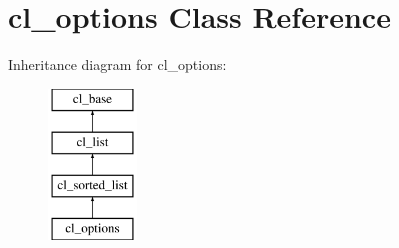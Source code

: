 \hypertarget{classcl__options}{
\section{cl\_\-options Class Reference}
\label{classcl__options}
}
Inheritance diagram for cl\_\-options:\begin{figure}[H]
\begin{center}
\leavevmode
\includegraphics[height=4.000000cm]{classcl__options}
\end{center}
\end{figure}

